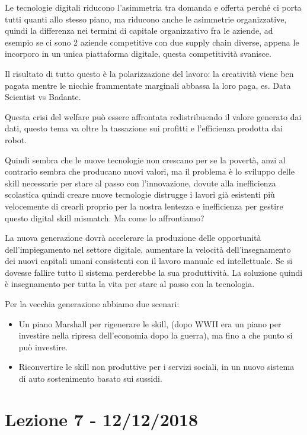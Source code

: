 \documentclass[]{article}
\begin{document}
Le tecnologie digitali riducono l'asimmetria tra domanda e offerta
perché ci porta tutti quanti allo stesso piano, ma riducono anche le
asimmetrie organizzative, quindi la differenza nei termini di capitale
organizzativo fra le aziende, ad esempio se ci sono 2 aziende
competitive con due supply chain diverse, appena le incorporo in un
unica piattaforma digitale, questa competitività svanisce.

Il risultato di tutto questo è la polarizzazione del lavoro: la
creatività viene ben pagata mentre le nicchie frammentate marginali
abbassa la loro paga, es. Data Scientist vs Badante.

Questa crisi del welfare può essere affrontata redistribuendo il valore
generato dai dati, questo tema va oltre la tassazione sui profitti e
l'efficienza prodotta dai robot.

Quindi sembra che le nuove tecnologie non crescano per se la povertà,
anzi al contrario sembra che producano nuovi valori, ma il problema è lo
sviluppo delle skill necessarie per stare al passo con l'innovazione,
dovute alla inefficienza scolastica quindi creare nuove tecnologie
distrugge i lavori già esistenti più velocemente di crearli proprio per
la nostra lentezza e inefficienza per gestire questo digital skill
mismatch. Ma come lo affrontiamo?

La nuova generazione dovrà accelerare la produzione delle opportunità
dell'impiegamento nel settore digitale, aumentare la velocità
dell'insegnamento dei nuovi capitali umani consistenti con il lavoro
manuale ed intellettuale. Se si dovesse fallire tutto il sistema
perderebbe la sua produttività. La soluzione quindi è insegnamento per
tutta la vita per stare al passo con la tecnologia.

Per la vecchia generazione abbiamo due scenari:

\begin{itemize}
	 
	\item
	Un piano Marshall per rigenerare le skill, (dopo WWII era un piano per
	investire nella ripresa dell'economia dopo la guerra), ma fino a che
	punto si può investire.
	\item
	Riconvertire le skill non produttive per i servizi sociali, in un
	nuovo sistema di auto sostenimento basato sui sussidi.
\end{itemize}
\section*{Lezione 7 - 12/12/2018}
\end{document}
